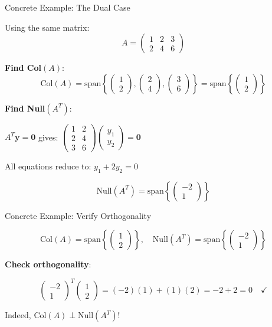 \documentclass[10pt]{beamer}
\theoremstyle{definition}
\newcommand{\x}[1]{\alert{\textbf{#1}}}
\begin{document}
\begin{frame}{Concrete Example: The Dual Case}

Using the same matrix:
$$A = \begin{pmatrix} 1 & 2 & 3 \\ 2 & 4 & 6 \end{pmatrix}$$

\x{Find Col$(A)$}:
$$\text{Col}(A) = \text{span}\left\{\begin{pmatrix} 1\\2 \end{pmatrix}, \begin{pmatrix} 2\\4 \end{pmatrix}, \begin{pmatrix} 3\\6 \end{pmatrix}\right\} = \text{span}\left\{\begin{pmatrix} 1\\2 \end{pmatrix}\right\}$$

\x{Find Null$(A^T)$}:

$A^T \mathbf{y} = \mathbf{0}$ gives: $\begin{pmatrix} 1 & 2 \\ 2 & 4 \\ 3 & 6 \end{pmatrix} \begin{pmatrix} y_1\\y_2 \end{pmatrix} = \mathbf{0}$

All equations reduce to: $y_1 + 2y_2 = 0$

$$\text{Null}(A^T) = \text{span}\left\{\begin{pmatrix} -2\\1 \end{pmatrix}\right\}$$

\end{frame}

\begin{frame}{Concrete Example: Verify Orthogonality}

$$\text{Col}(A) = \text{span}\left\{\begin{pmatrix} 1\\2 \end{pmatrix}\right\}, \quad \text{Null}(A^T) = \text{span}\left\{\begin{pmatrix} -2\\1 \end{pmatrix}\right\}$$

\x{Check orthogonality}:

$$\begin{pmatrix} -2\\1 \end{pmatrix}^T \begin{pmatrix} 1\\2 \end{pmatrix} = (-2)(1) + (1)(2) = -2 + 2 = 0 \quad \checkmark$$

Indeed, $\text{Col}(A) \perp \text{Null}(A^T)$!

\end{frame}
\end{document}
